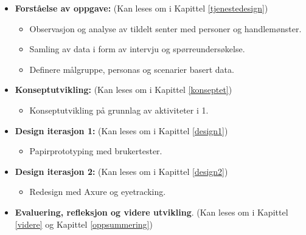 \begin{itemize}
    \item\textbf{Forståelse av oppgave:} (Kan leses om i Kapittel \ref{tjenestedesign})
    \begin{itemize}
        \item Observasjon og analyse av tildelt senter med personer og handlemønster.
        \item Samling av data i form av intervju og spørreundersøkelse.
        \item Definere målgruppe, personas og scenarier basert data.
    \end{itemize}
    \item\textbf{Konseptutvikling:} (Kan leses om i Kapittel \ref{konseptet})
    \begin{itemize}
        \item Konseptutvikling på grunnlag av aktiviteter i 1.
    \end{itemize}
    \item\textbf{Design iterasjon 1:} (Kan leses om i Kapittel \ref{design1})
    \begin{itemize}
        \item Papirprototyping med brukertester.
    \end{itemize}
    \item\textbf{Design iterasjon 2:} (Kan leses om i Kapittel \ref{design2})
    \begin{itemize}
        \item Redesign med Axure og eyetracking.
    \end{itemize}
    \item\textbf{Evaluering, refleksjon og videre utvikling}. (Kan leses om i Kapittel \ref{videre} og Kapittel \ref{oppsummering})
\end{itemize}





